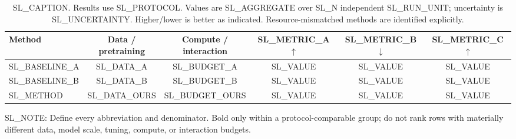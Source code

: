 \begin{table}[t]
  \centering
  \small
  \caption{SL_CAPTION. Results use SL_PROTOCOL. Values are SL_AGGREGATE over
  SL_N independent SL_RUN_UNIT; uncertainty is SL_UNCERTAINTY. Higher/lower is
  better as indicated. Resource-mismatched methods are identified explicitly.}
  \label{tab:SL_LABEL}
  \begin{tabular}{lccccc}
    \toprule
    Method & \shortstack{Data /\\pretraining} & \shortstack{Compute /\\interaction} & SL_METRIC_A $\uparrow$ &
    SL_METRIC_B $\downarrow$ & SL_METRIC_C $\uparrow$ \\
    \midrule
    SL_BASELINE_A & SL_DATA_A & SL_BUDGET_A & SL_VALUE & SL_VALUE & SL_VALUE \\
    SL_BASELINE_B & SL_DATA_B & SL_BUDGET_B & SL_VALUE & SL_VALUE & SL_VALUE \\
    \midrule
    SL_METHOD & SL_DATA_OURS & SL_BUDGET_OURS & SL_VALUE & SL_VALUE & SL_VALUE \\
    \bottomrule
  \end{tabular}

  \parbox{0.98\linewidth}{\footnotesize
  SL_NOTE: Define every abbreviation and denominator. Bold only within a
  protocol-comparable group; do not rank rows with materially different data,
  model scale, tuning, compute, or interaction budgets.}
\end{table}
